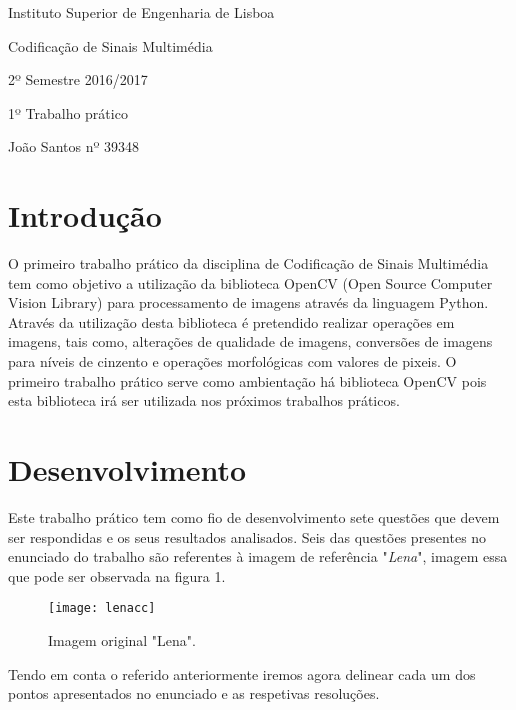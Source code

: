 \documentclass[12pt,a4paper]{article}
\begin{document}
\begin{titlepage}
\centering
{\LARGE Instituto Superior de Engenharia de Lisboa \par}
\vspace{1cm}
{\Large Codificação de Sinais Multimédia\par}
{\Large 2º Semestre 2016/2017\par}
\vspace{1.5cm}
{\huge 1º Trabalho prático\par}
\vspace{2cm}
{\Large João Santos nº 39348\par}
\end{titlepage}

\tableofcontents
\listoffigures

\clearpage

\section{Introdução}
O primeiro trabalho prático da disciplina de Codificação de Sinais Multimédia tem como objetivo a utilização da biblioteca OpenCV (Open Source Computer Vision Library) para processamento de imagens através da linguagem Python. Através da utilização desta biblioteca é pretendido realizar operações em imagens, tais como, alterações de qualidade de imagens, conversões de imagens para níveis de cinzento e operações morfológicas com valores de pixeis. O primeiro trabalho prático serve como ambientação há biblioteca OpenCV pois esta biblioteca irá ser utilizada nos próximos trabalhos práticos.

\clearpage

\section{Desenvolvimento}
Este trabalho prático tem como fio de desenvolvimento sete questões que devem ser respondidas e os seus resultados analisados. Seis das questões presentes no enunciado do trabalho são referentes à imagem de referência "\textit{Lena}", imagem essa que pode ser observada na figura 1.

\begin{figure}[h]
\texttt{[image: lenacc]}
\centering
\caption{Imagem original "Lena".}
\end{figure}

Tendo em conta o referido anteriormente iremos agora delinear cada um dos pontos apresentados no enunciado e as respetivas resoluções.
\end{document}
